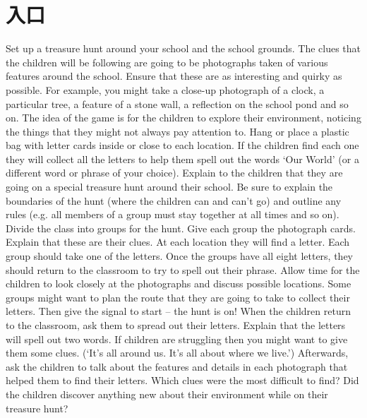 \chapter{入口}
Set up a treasure hunt around your school and the school grounds. The clues that the children will be following are going to be photographs taken of various features around the school. Ensure that these are as interesting and quirky as possible. For example, you might take a close-up photograph of a clock, a particular tree, a feature of a stone wall, a reflection on the school pond and so on. The idea of the game is for the children to explore their environment, noticing the things that they might not always pay attention to.
Hang or place a plastic bag with letter cards inside or close to each location. If the children find each one they will collect all the letters to help them spell out the words ‘Our World’ (or a different word or phrase of your choice).
Explain to the children that they are going on a special treasure hunt around their school. Be sure to explain the boundaries of the hunt (where the children can and can’t go) and outline any rules (e.g. all members of a group must stay together at all times and so on).
Divide the class into groups for the hunt. Give each group the photograph cards.
Explain that these are their clues. At each location they will find a letter. Each group should take one of the letters. Once the groups have all eight letters, they should return to the classroom to try to spell out their phrase.
Allow time for the children to look closely at the photographs and discuss possible locations. Some groups might want to plan the route that they are going to take to collect their letters. Then give the signal to start – the hunt is on!
When the children return to the classroom, ask them to spread out their letters. Explain that the letters will spell out two words. If children are struggling then you might want to give them some clues. (‘It’s all around us. It’s all about where we live.’)
Afterwards, ask the children to talk about the features and details in each photograph that helped them to find their letters. Which clues were the most difficult to find? Did the children discover anything new about their environment while on their treasure hunt?

